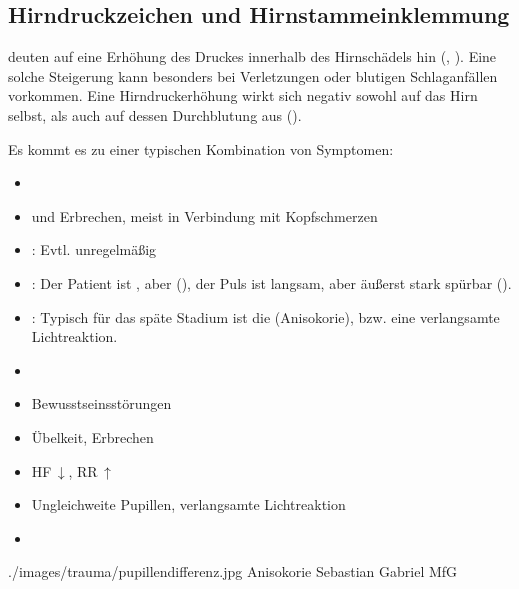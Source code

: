 \subsection{Hirndruckzeichen und Hirnstammeinklemmung}

{%
\label{topic:hirndruckzeichen-neu}%
{ deuten auf eine Erhöhung des Druckes 
innerhalb des Hirnschädels hin 
(, ).} 
%
Eine solche Steigerung kann besonders bei Verletzungen 
oder blutigen Schlaganfällen vorkommen. 
%
Eine Hirndruckerhöhung wirkt sich negativ sowohl auf das Hirn selbst, 
als auch auf dessen Durchblutung aus 
(). 

Es kommt es zu einer typischen Kombination von 
Symptomen: 
\begin{itemize}
  \item {} 
  \item {}  und Erbrechen, 
  meist in Verbindung mit Kopfschmerzen
  \item {} : Evtl. unregelmäßig
  \item {} : 
  Der Patient ist , aber  
  (), 
  der Puls ist langsam, 
  aber äußerst stark spürbar (). 
  \item {} : 
  Typisch für das späte Stadium ist die  
  {(Anisokorie)}, 
  bzw. eine verlangsamte Lichtreaktion.
  \item {}
\end{itemize}
\nocite{StriebelAnaesthesie2} %
}
{
\begin{itemize}
  \item {} Bewusstseinsstörungen
  \item {} Übelkeit, Erbrechen
  \item {} HF\,$\downarrow$, RR\,$\uparrow$
  \item {} Ungleichweite Pupillen, verlangsamte Lichtreaktion
  \item {}
\end{itemize}
}
{./images/trauma/pupillendifferenz.jpg}%
{Anisokorie}%
{}%
{Sebastian Gabriel}%
{MfG}%

